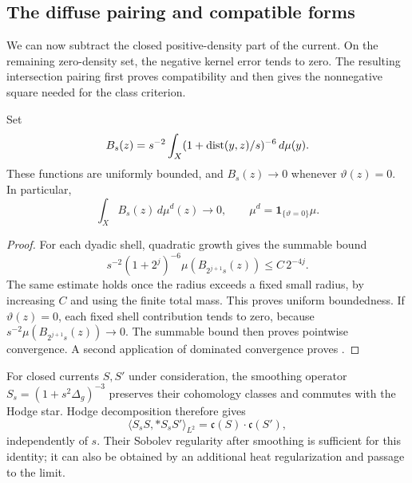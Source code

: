 \subsection{The diffuse pairing and compatible forms}

We can now subtract the closed positive-density part of the current.
On the remaining zero-density set, the negative kernel error tends to
zero. The resulting intersection pairing first proves compatibility
and then gives the nonnegative square needed for the class criterion.

\begin{lemma}
\label{lem:density-diffuse-error}
Set
\[
 B_s(z)=s^{-2}\int_X(1+\operatorname{dist}(y,z)/s)^{-6}\,d\mu(y).
\]
These functions are uniformly bounded, and \(B_s(z)\to0\) whenever
\(\vartheta(z)=0\).  In particular,
\begin{equation}\label{eq:density-diffuse-error}
 \int_X B_s(z)\,d\mu^d(z)\longrightarrow0,\qquad
 \mu^d=\mathbf1_{\{\vartheta=0\}}\mu.
\end{equation}
\end{lemma}

\begin{proof}
For each dyadic shell, quadratic growth gives the summable bound
\[
 s^{-2}(1+2^j)^{-6}\mu(B_{2^{j+1}s}(z))
 \le C\,2^{-4j}.
\]
The same estimate holds once the radius exceeds a fixed small
radius, by increasing \(C\) and using the finite total mass.
This proves uniform boundedness.  If \(\vartheta(z)=0\), each fixed
shell contribution tends to zero, because
\(s^{-2}\mu(B_{2^{j+1}s}(z))\to0\).
The summable bound then proves pointwise convergence.  A second
application of dominated convergence proves
.
\end{proof}

For closed currents \(S,S'\) under consideration, the smoothing
operator \(S_s=(1+s^2\Delta_g)^{-3}\) preserves their cohomology classes
and commutes with the Hodge star.  Hodge decomposition therefore gives
\begin{equation}\label{eq:density-smoothed-intersection}
 \langle S_sS,*S_sS'\rangle_{L^2}
 =\mathfrak c(S)\cdot\mathfrak c(S'),
\end{equation}
independently of \(s\).  Their Sobolev regularity after smoothing is
sufficient for this identity; it can also be obtained by an
additional heat regularization and passage to the limit.

